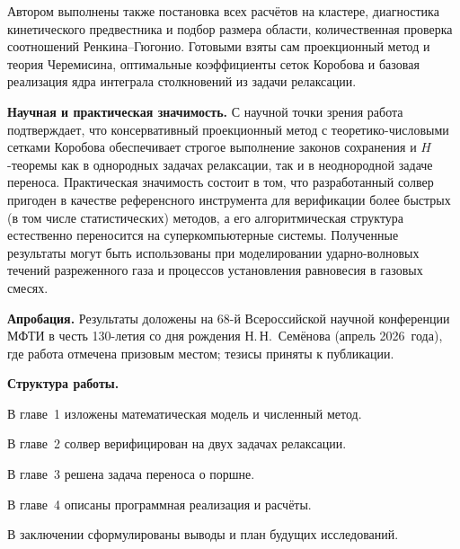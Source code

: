 Автором выполнены также постановка всех расчётов на кластере, диагностика кинетического предвестника и подбор размера
области, количественная проверка соотношений Ренкина--Гюгонио.
Готовыми взяты сам проекционный метод и теория Черемисина, оптимальные коэффициенты сеток Коробова и базовая реализация
ядра интеграла столкновений из задачи релаксации.

\textbf{Научная и практическая значимость.}
С научной точки зрения работа подтверждает, что консервативный проекционный метод с теоретико-числовыми сетками Коробова
обеспечивает строгое выполнение законов сохранения и $H$-теоремы как в однородных задачах релаксации, так и в
неоднородной задаче переноса.
Практическая значимость состоит в том, что разработанный солвер пригоден в качестве референсного инструмента для
верификации более быстрых (в том числе статистических) методов, а его алгоритмическая структура естественно переносится
на суперкомпьютерные системы.
Полученные результаты могут быть использованы при моделировании ударно-волновых течений разреженного газа и процессов
установления равновесия в газовых смесях.

\textbf{Апробация.}
Результаты доложены на 68-й Всероссийской научной конференции МФТИ в честь 130-летия со дня рождения Н.\,Н.~Семёнова
(апрель 2026~года), где работа отмечена призовым местом; тезисы приняты к публикации.

\textbf{Структура работы.}

В главе~1 изложены математическая модель и численный метод.

В главе~2 солвер верифицирован на двух задачах релаксации.

В главе~3 решена задача переноса о поршне.

В главе~4 описаны программная реализация и расчёты.

В заключении сформулированы выводы и план будущих исследований.


